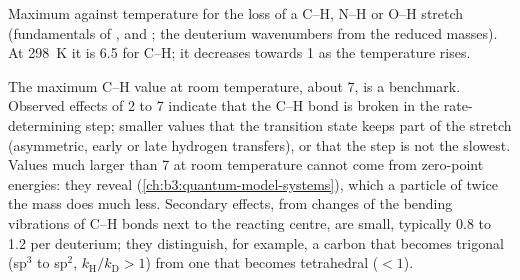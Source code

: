 \begin{omfigure}

{\small Maximum  against temperature for the loss
of a C--H, N--H or O--H stretch (fundamentals of ,  and ; the
deuterium wavenumbers from the reduced masses). At \qty{298}{K} it is 6.5 for C--H;
it decreases towards 1 as the temperature rises.}
\end{omfigure}

The maximum C--H value at room temperature, about 7, is a benchmark. Observed
effects of 2 to 7 indicate that the C--H bond is broken in the rate-determining
step; smaller values that the transition state keeps part of the stretch
(asymmetric, early or late hydrogen transfers), or that the step is not the
slowest. Values much larger than 7 at room temperature cannot come from
zero-point energies: they reveal  (\cref{ch:b3:quantum-model-systems}),
which a particle of twice the mass does much less. Secondary effects, from
changes of the bending vibrations of C--H bonds next to the reacting centre,
are small, typically 0.8 to 1.2 per deuterium; they distinguish, for example, a
carbon that becomes trigonal (sp$^3$ to sp$^2$, $k_{\mathrm H}/k_{\mathrm D} > 1$) from one that becomes
tetrahedral ($< 1$).

